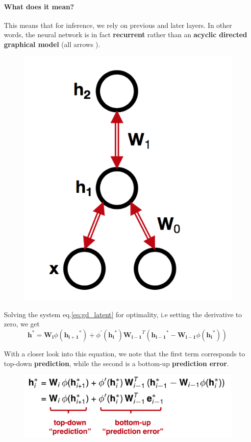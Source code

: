\documentclass[main]{subfiles}
\begin{document}
\paragraph{What does it mean?} This means that for inference, we rely on previous and later layers. In other words, the neural network is in fact \textbf{recurrent} rather than an \textbf{acyclic directed graphical model} (all arrows ).

\begin{figure}[H]
        \centering
        \includegraphics[width=0.4\linewidth]{06_PredictionErrorsDuringPerceptionAndLearning/figures/inference_rnn.png}
\end{figure}


Solving the system eq.\ref{eq:gd_latent} for optimality, i.e setting the derivative to zero, we get
\begin{equation}
    \bm{h}^* = \bm{W_i} \phi (\bm{h_{i+1}}^*) + \phi^\prime (\bm{h_{i}}^*)\bm{W_{i-1}}^T (\bm{h_{i-1}}^* - \bm{W_{i-1}}\phi (\bm{h_{i}}^*))
\end{equation}

\noindent With a closer look into this equation, we note that the first term corresponds to top-down \textbf{prediction}, while the second is a bottom-up \textbf{prediction error}.
\begin{figure}[H]
        \centering
        \includegraphics[width=0.9\linewidth]{06_PredictionErrorsDuringPerceptionAndLearning/figures/optimal_latent_error.png}
        \label{fig:prediction_error}
\end{figure}
\end{document}
